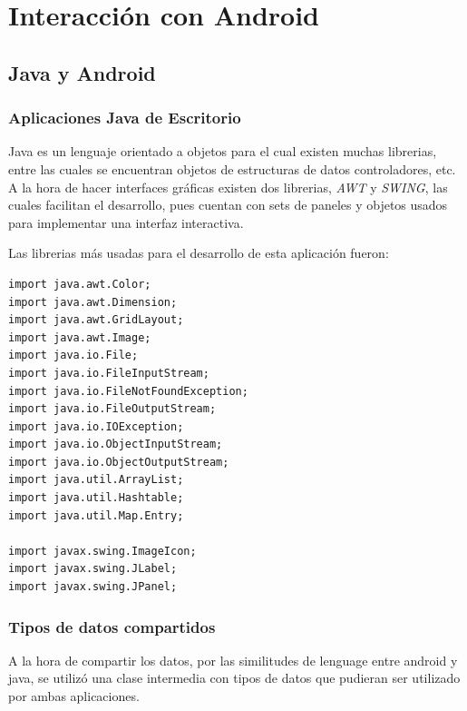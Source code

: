 \documentclass[11pt]{book}
\begin{document}




\part{Interacción con Android}  

\chapter{Java y Android}           
\section{Aplicaciones Java de Escritorio}
Java es un lenguaje orientado a objetos para el cual existen muchas librerias, entre las cuales se encuentran objetos de estructuras de datos controladores, etc. A la hora de hacer interfaces gráficas existen dos librerias, \emph{AWT} y \emph{SWING}, las cuales facilitan el desarrollo, pues cuentan con sets de paneles y objetos usados para implementar una interfaz interactiva.

Las librerias más usadas para el desarrollo de esta aplicación fueron:

\begin{lstlisting}
import java.awt.Color;
import java.awt.Dimension;
import java.awt.GridLayout;
import java.awt.Image;
import java.io.File;
import java.io.FileInputStream;
import java.io.FileNotFoundException;
import java.io.FileOutputStream;
import java.io.IOException;
import java.io.ObjectInputStream;
import java.io.ObjectOutputStream;
import java.util.ArrayList;
import java.util.Hashtable;
import java.util.Map.Entry;

import javax.swing.ImageIcon;
import javax.swing.JLabel;
import javax.swing.JPanel;
\end{lstlisting}

\section{Tipos de datos compartidos}
A la hora de compartir los datos, por las similitudes de lenguage entre android y java, se utilizó una clase intermedia con tipos de datos que pudieran ser utilizado por ambas aplicaciones.
\end{document}
